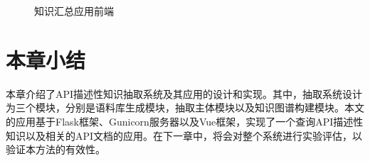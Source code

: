 \begin{figure}[htb]
    \centering
    \caption{知识汇总应用前端} 
    \label{fig:fig1} 
\end{figure}

\section{本章小结}
本章介绍了API描述性知识抽取系统及其应用的设计和实现。其中，抽取系统设计为三个模块，分别是语料库生成模块，抽取主体模块以及知识图谱构建模块。本文的应用基于Flask框架、Gunicorn服务器以及Vue框架，实现了一个查询API描述性知识以及相关的API文档的应用。在下一章中，将会对整个系统进行实验评估，以验证本方法的有效性。
